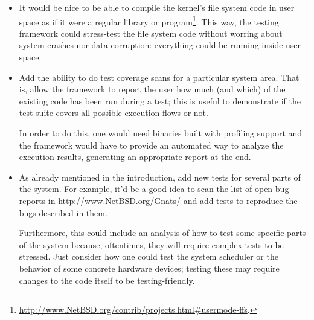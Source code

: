 \documentclass[a4paper,10pt]{article}
\begin{document}
\begin{itemize}
\item It would be nice to be able to compile the kernel's file system code
in user space as if it were a regular library or program\footnote{
\url{http://www.NetBSD.org/contrib/projects.html#usermode-ffs}.}.  This
way, the testing framework could stress-test the file system code without
worring about system crashes nor data corruption: everything could be
running inside user space.

\item Add the ability to do test coverage scans for a particular system
area.  That is, allow the framework to report the user how much (and
which) of the existing code has been run during a test; this is useful to
demonstrate if the test suite covers all possible execution flows or not.

In order to do this, one would need binaries built with profiling support
and the framework would have to provide an automated way to analyze the
execution results, generating an appropriate report at the end.

\item As already mentioned in the introduction, add new tests for several
parts of the system.  For example, it'd be a good idea to scan the list of
open bug reports in \url{http://www.NetBSD.org/Gnats/} and add tests to
reproduce the bugs described in them.

Furthermore, this could include an analysis of how to test some specific
parts of the system because, oftentimes, they will require complex tests
to be stressed.  Just consider how one could test the system scheduler or
the behavior of some concrete hardware devices; testing these may require
changes to the code itself to be testing-friendly.
\end{itemize}
\end{document}
